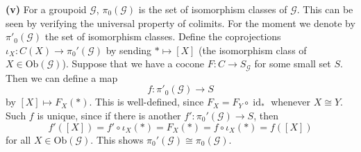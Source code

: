 \documentclass[a4paper,11pt]{amsart}
\DeclareMathOperator{\id}{id}
\newcommand{\G}{\mathcal G}
\newcommand{\ob}{\mathrm{Ob}}
\begin{document}
\textbf{(v)} For a groupoid $\G$, $\pi_0(\G)$ is the set of isomorphism classes of $\G$. This can be seen by verifying the universal property of colimits. For the moment we denote by $\pi'_0(\G)$ the set of isomorphism classes. Define the coprojections $\iota_X\colon C(X)\to\pi_0'(\G)$ by sending $*\mapsto[X]$ (the isomorphism class of $X\in\ob(\G)$). Suppose that we have a cocone $F\colon C\to S_\G$ for some small set $S$. Then we can define a map
\[
f\colon\pi'_0(\G)\to S
\]
by $[X]\mapsto F_X(*)$. This is well-defined, since $F_X=F_Y\circ\id_*$ whenever $X\cong Y$. Such $f$ is unique, since if there is another $f'\colon\pi_0'(\G)\to S$, then 
\[
f'([X])=f'\circ \iota_X(*)=F_X(*)=f\circ\iota_X(*)=f([X])
\]
for all $X\in\ob(\G)$. This shows $\pi_0'(\G)\cong\pi_0(\G)$.
\end{document}

